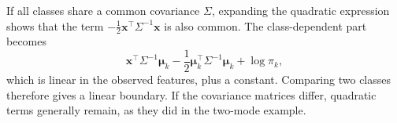 If all classes share a common covariance \(\Sigma\), expanding the
quadratic expression shows that the term
\(-\tfrac12\mathbf x^\top\Sigma^{-1}\mathbf x\) is also common.
The class-dependent part becomes
\[
  \mathbf x^\top\Sigma^{-1}\boldsymbol\mu_k
  -\frac12\boldsymbol\mu_k^\top\Sigma^{-1}\boldsymbol\mu_k
  +\log\pi_k,
\]
which is linear in the observed features, plus a constant. Comparing
two classes therefore gives a linear boundary. If the covariance
matrices differ, quadratic terms generally remain, as they did in the
two-mode example.
